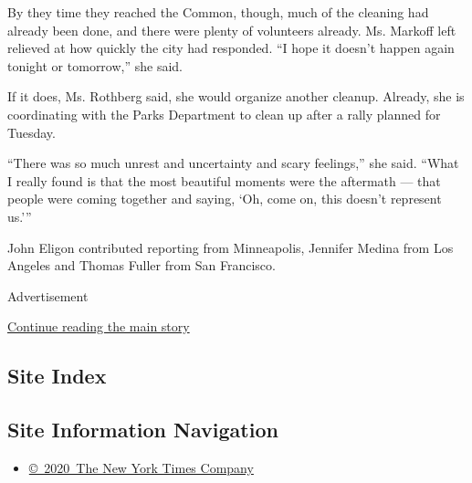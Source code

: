 By they time they reached the Common, though, much of the cleaning had
already been done, and there were plenty of volunteers already. Ms.
Markoff left relieved at how quickly the city had responded. ``I hope it
doesn't happen again tonight or tomorrow,'' she said.

If it does, Ms. Rothberg said, she would organize another cleanup.
Already, she is coordinating with the Parks Department to clean up after
a rally planned for Tuesday.

``There was so much unrest and uncertainty and scary feelings,'' she
said. ``What I really found is that the most beautiful moments were the
aftermath --- that people were coming together and saying, `Oh, come on,
this doesn't represent us.'''

John Eligon contributed reporting from Minneapolis, Jennifer Medina from
Los Angeles and Thomas Fuller from San Francisco.

Advertisement

\protect\hyperlink{after-bottom}{Continue reading the main story}

\hypertarget{site-index}{%
\subsection{Site Index}\label{site-index}}

\hypertarget{site-information-navigation}{%
\subsection{Site Information
Navigation}\label{site-information-navigation}}

\begin{itemize}
\tightlist
\item
  \href{https://help.nytimes.com/hc/en-us/articles/115014792127-Copyright-notice}{©~2020~The
  New York Times Company}
\end{itemize}

